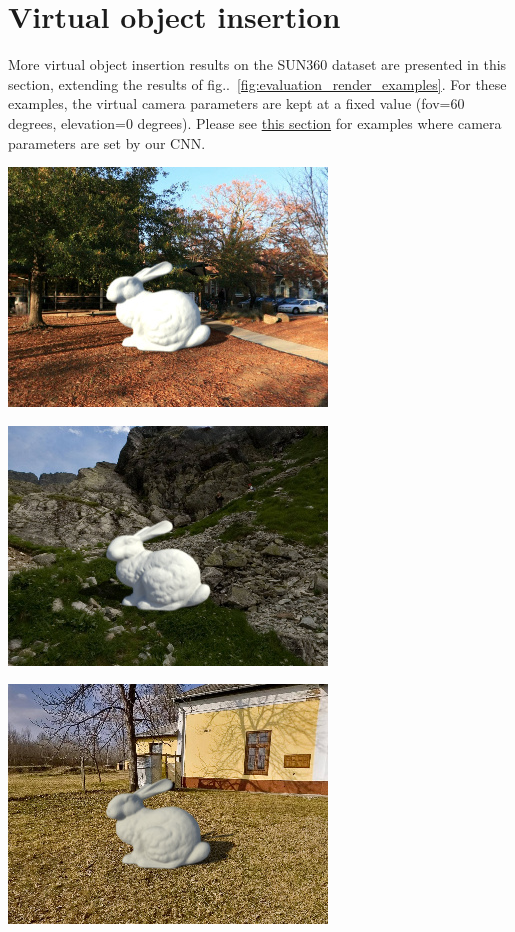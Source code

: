 \protect\hypertarget{virtualobjectinsert}{}{}

\hypertarget{virtual-object-insertion}{%
\section{Virtual object
insertion}\label{virtual-object-insertion}}

More virtual object insertion results on the SUN360 dataset are
presented in this section, extending the results of fig..~\ref{fig:evaluation_render_examples}. For these
examples, the virtual camera parameters are kept at a fixed value
(fov=60 degrees, elevation=0 degrees). Please see
\protect\hyperlink{camparaminsertionex}{this section} for examples where
camera parameters are set by our CNN.

\begin{multicols}{3}

\includegraphics[width=\mywidth]{pano_amclvftibwceyr.jpg}

\includegraphics[width=\mywidth]{pano_aoexvqbqucbcuw.jpg}

\includegraphics[width=\mywidth]{pano_apkqohzzaljfyl.jpg}


\end{multicols}

